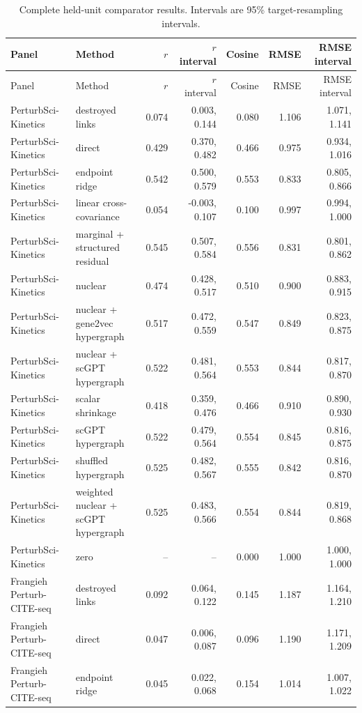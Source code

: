 \begin{longtable}{@{}p{2.5cm}p{5.0cm}rrrrr@{}}
\caption{Complete held-unit comparator results. Intervals are 95\% target-resampling intervals.}\label{tab:s-comparators}\\
\toprule
Panel & Method & $r$ & $r$ interval & Cosine & RMSE & RMSE interval \\
\midrule
\endfirsthead
\toprule
Panel & Method & $r$ & $r$ interval & Cosine & RMSE & RMSE interval \\
\midrule
\endhead
PerturbSci-Kinetics & destroyed links & 0.074 & 0.003, 0.144 & 0.080 & 1.106 & 1.071, 1.141 \\
PerturbSci-Kinetics & direct & 0.429 & 0.370, 0.482 & 0.466 & 0.975 & 0.934, 1.016 \\
PerturbSci-Kinetics & endpoint ridge & 0.542 & 0.500, 0.579 & 0.553 & 0.833 & 0.805, 0.866 \\
PerturbSci-Kinetics & linear cross-covariance & 0.054 & -0.003, 0.107 & 0.100 & 0.997 & 0.994, 1.000 \\
PerturbSci-Kinetics & marginal + structured residual & 0.545 & 0.507, 0.584 & 0.556 & 0.831 & 0.801, 0.862 \\
PerturbSci-Kinetics & nuclear & 0.474 & 0.428, 0.517 & 0.510 & 0.900 & 0.883, 0.915 \\
PerturbSci-Kinetics & nuclear + gene2vec hypergraph & 0.517 & 0.472, 0.559 & 0.547 & 0.849 & 0.823, 0.875 \\
PerturbSci-Kinetics & nuclear + scGPT hypergraph & 0.522 & 0.481, 0.564 & 0.553 & 0.844 & 0.817, 0.870 \\
PerturbSci-Kinetics & scalar shrinkage & 0.418 & 0.359, 0.476 & 0.466 & 0.910 & 0.890, 0.930 \\
PerturbSci-Kinetics & scGPT hypergraph & 0.522 & 0.479, 0.564 & 0.554 & 0.845 & 0.816, 0.875 \\
PerturbSci-Kinetics & shuffled hypergraph & 0.525 & 0.482, 0.567 & 0.555 & 0.842 & 0.816, 0.870 \\
PerturbSci-Kinetics & weighted nuclear + scGPT hypergraph & 0.525 & 0.483, 0.566 & 0.554 & 0.844 & 0.819, 0.868 \\
PerturbSci-Kinetics & zero & -- & -- & 0.000 & 1.000 & 1.000, 1.000 \\
Frangieh Perturb-CITE-seq & destroyed links & 0.092 & 0.064, 0.122 & 0.145 & 1.187 & 1.164, 1.210 \\
Frangieh Perturb-CITE-seq & direct & 0.047 & 0.006, 0.087 & 0.096 & 1.190 & 1.171, 1.209 \\
Frangieh Perturb-CITE-seq & endpoint ridge & 0.045 & 0.022, 0.068 & 0.154 & 1.014 & 1.007, 1.022 \\

\end{longtable}
